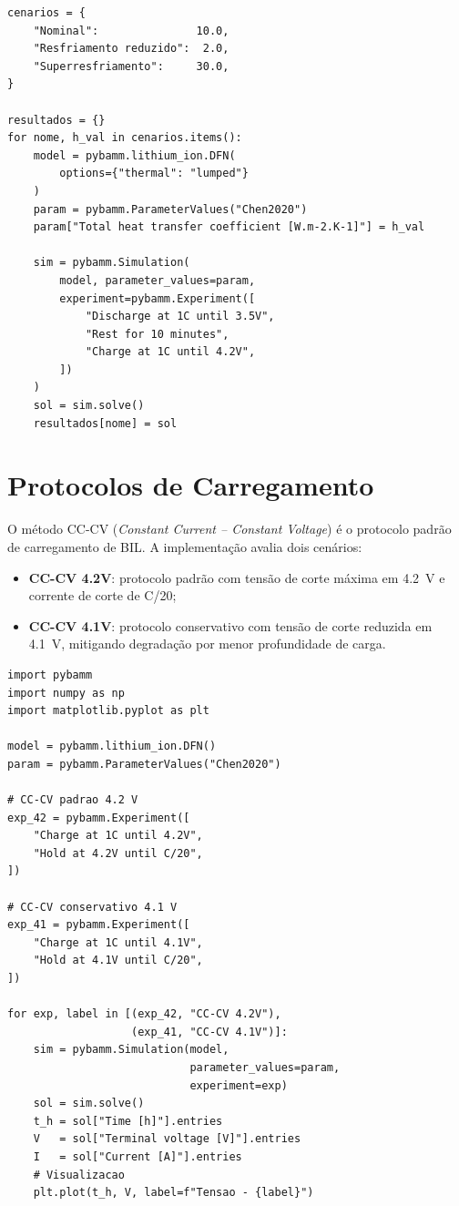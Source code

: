 \documentclass[
    12pt,
    openright,
    twoside,
    a4paper,
    brazil,
    english
]{abntex2}
\begin{document}
\begin{lstlisting}[caption={Simulação de falha no sistema de resfriamento via variação de $h$.},
                   label={lst:falha_resfriamento}]
cenarios = {
    "Nominal":               10.0,
    "Resfriamento reduzido":  2.0,
    "Superresfriamento":     30.0,
}

resultados = {}
for nome, h_val in cenarios.items():
    model = pybamm.lithium_ion.DFN(
        options={"thermal": "lumped"}
    )
    param = pybamm.ParameterValues("Chen2020")
    param["Total heat transfer coefficient [W.m-2.K-1]"] = h_val

    sim = pybamm.Simulation(
        model, parameter_values=param,
        experiment=pybamm.Experiment([
            "Discharge at 1C until 3.5V",
            "Rest for 10 minutes",
            "Charge at 1C until 4.2V",
        ])
    )
    sol = sim.solve()
    resultados[nome] = sol
\end{lstlisting}

\section{Protocolos de Carregamento}

O método CC-CV (\textit{Constant Current -- Constant Voltage}) é o protocolo
padrão de carregamento de BIL. A implementação avalia dois cenários:

\begin{itemize}
  \item \textbf{CC-CV 4.2V}: protocolo padrão com tensão de corte máxima em
        \SI{4.2}{\volt} e corrente de corte de C/20;
  \item \textbf{CC-CV 4.1V}: protocolo conservativo com tensão de corte
        reduzida em \SI{4.1}{\volt}, mitigando degradação por menor profundidade
        de carga.
\end{itemize}

\begin{lstlisting}[caption={Implementação do protocolo CC-CV para análise comparativa.},
                   label={lst:cccv}]
import pybamm
import numpy as np
import matplotlib.pyplot as plt

model = pybamm.lithium_ion.DFN()
param = pybamm.ParameterValues("Chen2020")

# CC-CV padrao 4.2 V
exp_42 = pybamm.Experiment([
    "Charge at 1C until 4.2V",
    "Hold at 4.2V until C/20",
])

# CC-CV conservativo 4.1 V
exp_41 = pybamm.Experiment([
    "Charge at 1C until 4.1V",
    "Hold at 4.1V until C/20",
])

for exp, label in [(exp_42, "CC-CV 4.2V"),
                   (exp_41, "CC-CV 4.1V")]:
    sim = pybamm.Simulation(model,
                            parameter_values=param,
                            experiment=exp)
    sol = sim.solve()
    t_h = sol["Time [h]"].entries
    V   = sol["Terminal voltage [V]"].entries
    I   = sol["Current [A]"].entries
    # Visualizacao
    plt.plot(t_h, V, label=f"Tensao - {label}")
\end{lstlisting}
\end{document}
